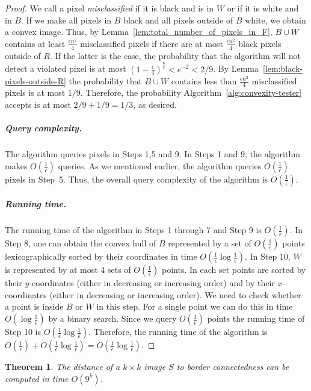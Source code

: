 \documentclass[11pt,english]{article}
\newtheorem{theorem}{Theorem}[section]
\numberwithin{figure}{section}
\newcommand{\eps}{{\epsilon}}
\begin{document}
\begin{proof}
We call a pixel {\em misclassified} if it is black and is in $W$ or if it is white and in $B$.
If we make all pixels in $B$ black and all pixels outside of $B$ white, we obtain a
convex image. Thus, by Lemma~\ref{lem:total_number_of_pixels_in_F},
$B\cup W$ contains at least $\frac{\eps n^{2}}{4}$ misclassified pixels if there are
at most $\frac{\eps n^{2}}{4}$ black pixels outside of $R$. If the latter is the
case, the probability that the algorithm will not detect a violated pixel
is at most $(1-\frac{\eps}{4})^{\frac{8}{\eps}}<e^{-2}<2/9$. By
Lemma~\ref{lem:black-pixels-outside-R} the probability that $B\cup W$
contains less than $\frac{\eps n^{2}}{4}$ misclassified pixels is at most
$1/9$.
Therefore, the probability Algorithm~\ref{alg:convexity-tester} accepts is at most
$2/9+1/9=1/3$, as desired.
\subparagraph{Query complexity.} The algorithm queries pixels in Steps 1,5 and 9.
In Steps 1 and 9, the algorithm makes $O(\frac{1}{\eps})$ queries. As we mentioned earlier, the
algorithm queries $O(\frac{1}{\eps})$ pixels in Step~5. Thus, the overall query
complexity of the algorithm is $O(\frac{1}{\eps})$.

\subparagraph{Running time.} The running time of the algorithm in Steps 1 through
7 and Step 9 is $O(\frac{1}{\eps})$. In Step 8, one can
obtain the convex hull of $B$ represented by a set of
$O(\frac{1}{\eps})$ points lexicographically sorted by their coordinates
in time $O(\frac{1}{\eps}\log \frac{1}{\eps})$. In Step 10, $W$ is represented
by at most 4 sets of $O(\frac{1}{\eps})$ points. In each set points are sorted
by their $y$-coordinates (either in decreasing or increasing order) and by
their $x$-coordinates (either in decreasing or increasing order).
We need to check whether a point is inside $B$ or $W$ in this step. For a single point we can do
this in time $O(\log \frac{1}{\eps})$ by a
binary search. Since we query $O(\frac{1}{\eps})$ points the running
time of Step 10 is $O(\frac{1}{\eps}\log \frac{1}{\eps})$. Therefore, the running time
of the algorithm is $O(\frac{1}{\eps})+O(\frac{1}{\eps}\log \frac{1}{\eps})=O(\frac{1}{\eps}\log \frac{1}{\eps})$.
\end{proof}
\begin{theorem}\label{thm:border-con}
The distance of a $k\times k$ image $S$ to border connectedness can be computed
in time $O(9^k)$.
\end{theorem}
\end{document}
